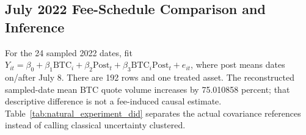 \subsection{July 2022 Fee-Schedule Comparison and Inference}
For the 24 sampled 2022 dates, fit $Y_{it}=\beta_0+\beta_1\mathrm{BTC}_i+\beta_2\mathrm{Post}_t+\beta_3\mathrm{BTC}_i\mathrm{Post}_t+e_{it}$, where post means dates on/after July 8. There are 192 rows and one treated asset. The reconstructed sampled-date mean BTC quote volume increases by 75.010858 percent; that descriptive difference is not a fee-induced causal estimate. Table~\ref{tab:natural_experiment_did} separates the actual covariance references instead of calling classical uncertainty clustered.
\begin{table}[htbp]
\centering\footnotesize\setlength{\tabcolsep}{3pt}
\caption{Recomputed BTC-by-post association in the original 192-unit 2022 panel. The same four-regressor specification is evaluated under three covariance references; cluster counts are eight assets and 24 sampled dates. The assignment is not randomized.}
\label{tab:natural_experiment_did}
\end{table}

